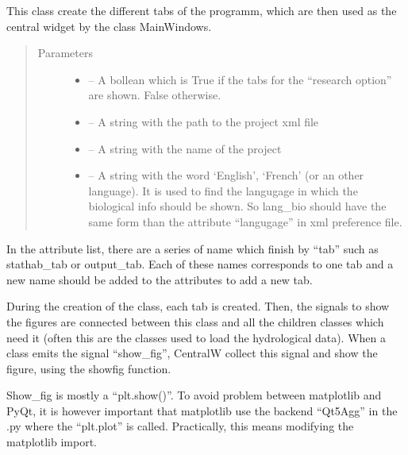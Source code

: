 \documentclass[letterpaper,10pt,english]{sphinxmanual}
\begin{document}
\begin{fulllineitems}
\label{\detokenize{index:src_GUI.Main_windows_1.CentralW}}
This class create the different tabs of the programm, which are then used as the central widget by the class
MainWindows.
\begin{quote}\begin{description}
\item[{Parameters}] \leavevmode\begin{itemize}
\item {} 
 -- A bollean which is True if the tabs for the ``research option'' are shown. False otherwise.

\item {} 
 -- A string with the path to the project xml file

\item {} 
 -- A string with the name of the project

\item {} 
 -- A string with the word `English', `French' (or an other language). It is used to find the langugage
in which the biological info should be shown. So lang\_bio should have the same form than the attribute
``langugage'' in xml preference file.

\end{itemize}

\end{description}\end{quote}


In the attribute list, there are a series of name which finish by “tab” such as stathab\_tab or output\_tab. Each of
these names corresponds to one tab and a new name should be added to the attributes to add a new tab.

During the creation of the class, each tab is created. Then, the signals to show the figures are connected between this
class and all the children classes which need it (often this are the classes used to load the hydrological data). When a
class emits the signal “show\_fig”, CentralW collect this signal and show the figure, using the showfig function.

Show\_fig is mostly a “plt.show()”. To avoid problem between matplotlib and PyQt, it is however important that
matplotlib use the backend “Qt5Agg” in the .py where the “plt.plot” is called. Practically, this means modifying
the matplotlib import.


\end{fulllineitems}
\end{document}
